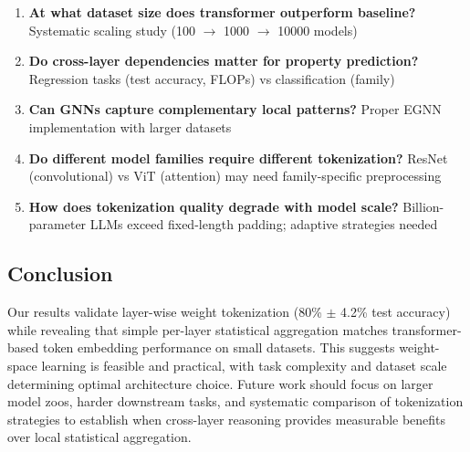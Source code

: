 \begin{enumerate}
\item \textbf{At what dataset size does transformer outperform baseline?} Systematic scaling study (100 $\rightarrow$ 1000 $\rightarrow$ 10000 models)

\item \textbf{Do cross-layer dependencies matter for property prediction?} Regression tasks (test accuracy, FLOPs) vs classification (family)

\item \textbf{Can GNNs capture complementary local patterns?} Proper EGNN implementation with larger datasets

\item \textbf{Do different model families require different tokenization?} ResNet (convolutional) vs ViT (attention) may need family-specific preprocessing

\item \textbf{How does tokenization quality degrade with model scale?} Billion-parameter LLMs exceed fixed-length padding; adaptive strategies needed
\end{enumerate}

\subsection{Conclusion}

Our results validate layer-wise weight tokenization (80\% $\pm$ 4.2\% test accuracy) while revealing that simple per-layer statistical aggregation matches transformer-based token embedding performance on small datasets. This suggests weight-space learning is feasible and practical, with task complexity and dataset scale determining optimal architecture choice. Future work should focus on larger model zoos, harder downstream tasks, and systematic comparison of tokenization strategies to establish when cross-layer reasoning provides measurable benefits over local statistical aggregation.
